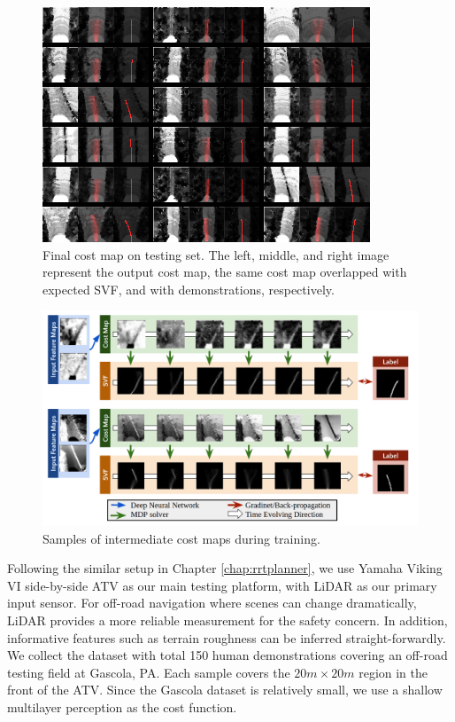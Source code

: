 \documentclass[../thesis.tex]{subfiles}
\begin{document}
\begin{figure}[t]
        \begin{center}
         \centerline{\includegraphics[width=0.8\columnwidth]{./DIRL/fig/gradtestImg040.png}}
               \caption{Final cost map on testing set. The left, middle, and right image represent the output cost map, the same cost map overlapped with expected SVF, and with demonstrations, respectively.}
               \label{fig:final_cost_map}
        \end{center}
        \vskip -0.2in
\end{figure}
 
\begin{figure}[t]
      \begin{center}
       \centerline{\includegraphics[width=\columnwidth]{./DIRL/fig/inter_cost_map.png}}
            \caption{Samples of intermediate cost maps during training.}
            \label{fig:inter_cost_map}
      \end{center}
      \vskip -0.2in
\end{figure}

Following the similar setup in Chapter \ref{chap:rrtplanner}, we use Yamaha Viking VI side-by-side ATV as our main testing platform, with LiDAR as our primary input sensor.
For off-road navigation where scenes can change dramatically, LiDAR provides a more reliable measurement for the safety concern.
In addition, informative features such as terrain roughness can be inferred straight-forwardly.
We collect the dataset with total 150 human demonstrations covering an off-road testing field at Gascola, PA. Each sample covers the $20m \times 20m$ region in the front of the ATV. Since the Gascola dataset is relatively small, we use a shallow multilayer perception as the cost function.
 
\end{document}
